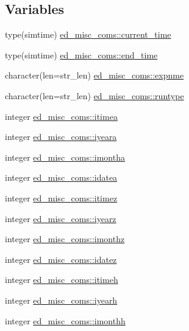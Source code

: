 \subsection*{Variables}
\begin{DoxyCompactItemize}
\item 
type(simtime) \hyperlink{namespaceed__misc__coms_a74892b22b952f148c3ba1bfb0f150692}{ed\+\_\+misc\+\_\+coms\+::current\+\_\+time}
\item 
type(simtime) \hyperlink{namespaceed__misc__coms_a6b19c4e99a003ac8f1dbda410dd35599}{ed\+\_\+misc\+\_\+coms\+::end\+\_\+time}
\item 
character(len=str\+\_\+len) \hyperlink{namespaceed__misc__coms_a0ce8ecbb164c2b948efa6fca900dd9d0}{ed\+\_\+misc\+\_\+coms\+::expnme}
\item 
character(len=str\+\_\+len) \hyperlink{namespaceed__misc__coms_ac6069e59fcce057c13f934284b112682}{ed\+\_\+misc\+\_\+coms\+::runtype}
\item 
integer \hyperlink{namespaceed__misc__coms_a7861e694d07384bd17925c3f4607b525}{ed\+\_\+misc\+\_\+coms\+::itimea}
\item 
integer \hyperlink{namespaceed__misc__coms_acd0b7adb20595807c690a5e091d4adab}{ed\+\_\+misc\+\_\+coms\+::iyeara}
\item 
integer \hyperlink{namespaceed__misc__coms_a77a981fafd63a7d95ae3c331a43383dd}{ed\+\_\+misc\+\_\+coms\+::imontha}
\item 
integer \hyperlink{namespaceed__misc__coms_a5f114c94d8dae7a612c2a74dd15cf9e8}{ed\+\_\+misc\+\_\+coms\+::idatea}
\item 
integer \hyperlink{namespaceed__misc__coms_a52d1c4a5cf64ff5aeded21a7cf0583b3}{ed\+\_\+misc\+\_\+coms\+::itimez}
\item 
integer \hyperlink{namespaceed__misc__coms_ad090bb31c332e954cdd55abd938fed1d}{ed\+\_\+misc\+\_\+coms\+::iyearz}
\item 
integer \hyperlink{namespaceed__misc__coms_a21c190fb313ac537f9025274d8e8075e}{ed\+\_\+misc\+\_\+coms\+::imonthz}
\item 
integer \hyperlink{namespaceed__misc__coms_a05d9796c9d0896819a7a79828f8272ab}{ed\+\_\+misc\+\_\+coms\+::idatez}
\item 
integer \hyperlink{namespaceed__misc__coms_a8a7adcff3ecba9c5b71afd58481a9b7b}{ed\+\_\+misc\+\_\+coms\+::itimeh}
\item 
integer \hyperlink{namespaceed__misc__coms_a837450f62eb3c1e01ddace809d123883}{ed\+\_\+misc\+\_\+coms\+::iyearh}
\item 
integer \hyperlink{namespaceed__misc__coms_acd8c94d7731ef2f85c4c39dea743ba84}{ed\+\_\+misc\+\_\+coms\+::imonthh}

\end{DoxyCompactItemize}
